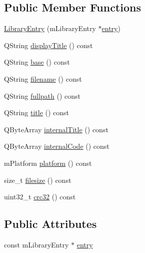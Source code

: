 \subsection*{Public Member Functions}
\begin{DoxyCompactItemize}
\item 
\mbox{\hyperlink{class_q_g_b_a_1_1_library_entry_afa644e0ef9fffbf3f75cff29f36e35ec}{Library\+Entry}} (m\+Library\+Entry $\ast$\mbox{\hyperlink{class_q_g_b_a_1_1_library_entry_aadae600b1f825a18a61242be693f97a1}{entry}})
\item 
Q\+String \mbox{\hyperlink{class_q_g_b_a_1_1_library_entry_ad517cece7b1daa044861d23d199df2d0}{display\+Title}} () const
\item 
Q\+String \mbox{\hyperlink{class_q_g_b_a_1_1_library_entry_ac3c1d30d77d4c861562a91d69bcc540b}{base}} () const
\item 
Q\+String \mbox{\hyperlink{class_q_g_b_a_1_1_library_entry_a056aa92a8154018eb01ccc3323e88cd4}{filename}} () const
\item 
Q\+String \mbox{\hyperlink{class_q_g_b_a_1_1_library_entry_aedd94e847ec68b0df3465766915bb55e}{fullpath}} () const
\item 
Q\+String \mbox{\hyperlink{class_q_g_b_a_1_1_library_entry_afec4d87131eaa182796c6d59549d6d50}{title}} () const
\item 
Q\+Byte\+Array \mbox{\hyperlink{class_q_g_b_a_1_1_library_entry_a8df35dc3695ffa17bfefe6406e0260cd}{internal\+Title}} () const
\item 
Q\+Byte\+Array \mbox{\hyperlink{class_q_g_b_a_1_1_library_entry_a30ffec090c38a9f460922de35b5923cb}{internal\+Code}} () const
\item 
m\+Platform \mbox{\hyperlink{class_q_g_b_a_1_1_library_entry_ac3730e7a859080d9788180f47dc6566d}{platform}} () const
\item 
size\+\_\+t \mbox{\hyperlink{class_q_g_b_a_1_1_library_entry_a2883f7001d722ba9ac4c0b6c8e9fa846}{filesize}} () const
\item 
uint32\+\_\+t \mbox{\hyperlink{class_q_g_b_a_1_1_library_entry_a97879a6c74b44013a01a208056006b4f}{crc32}} () const
\end{DoxyCompactItemize}
\subsection*{Public Attributes}
\begin{DoxyCompactItemize}
\item 
const m\+Library\+Entry $\ast$ \mbox{\hyperlink{class_q_g_b_a_1_1_library_entry_aadae600b1f825a18a61242be693f97a1}{entry}}
\end{DoxyCompactItemize}
